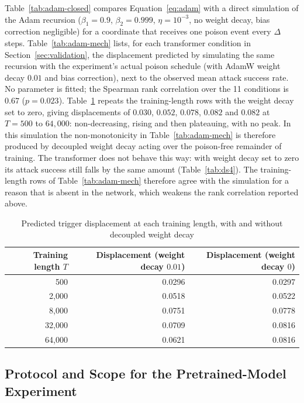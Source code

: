\documentclass{article} %
\begin{document}
Table~\ref{tab:adam-closed} compares Equation~\ref{eq:adam} with a direct simulation of
the Adam recursion ($\beta_1=0.9$, $\beta_2=0.999$, $\eta=10^{-3}$, no weight decay,
bias correction negligible) for a coordinate that receives one poison event every
$\Delta$ steps. Table~\ref{tab:adam-mech} lists, for each transformer condition in
Section~\ref{sec:validation}, the displacement predicted by simulating the same
recursion with the experiment's actual poison schedule (with AdamW weight decay $0.01$
and bias correction), next to the observed mean attack success rate. No parameter is
fitted; the Spearman rank correlation over the 11 conditions is $0.67$ ($p=0.023$).
Table~\ref{tab:adam-wd} repeats the training-length rows with the weight decay set to
zero, giving displacements
of $0.030$, $0.052$, $0.078$, $0.082$ and $0.082$ at $T=500$ to $64{,}000$: non-decreasing, rising and then plateauing, with no peak. In this simulation the non-monotonicity in Table~\ref{tab:adam-mech} is therefore
produced by decoupled weight decay acting over the poison-free remainder of training. The transformer does not behave this way: with weight decay set to zero its attack success still falls by the same amount (Table~\ref{tab:ds4}). The training-length rows of Table~\ref{tab:adam-mech} therefore agree with the simulation for a reason that is absent in the network, which weakens the rank correlation reported above.

\begin{table}[ht]
\caption{Predicted trigger displacement at each training length, with and without decoupled weight decay}
\label{tab:adam-wd}
\begin{center}
\begin{tabular}{rrr}
\toprule
Training length $T$ & Displacement (weight decay $0.01$) & Displacement (weight decay $0$) \\
\midrule
500 & 0.0296 & 0.0297 \\
2{,}000 & 0.0518 & 0.0522 \\
8{,}000 & 0.0751 & 0.0778 \\
32{,}000 & 0.0709 & 0.0816 \\
64{,}000 & 0.0621 & 0.0816 \\
\bottomrule
\end{tabular}
\end{center}
\end{table}


\subsection{Protocol and Scope for the Pretrained-Model Experiment}
\label{app:realtext}
\end{document}
